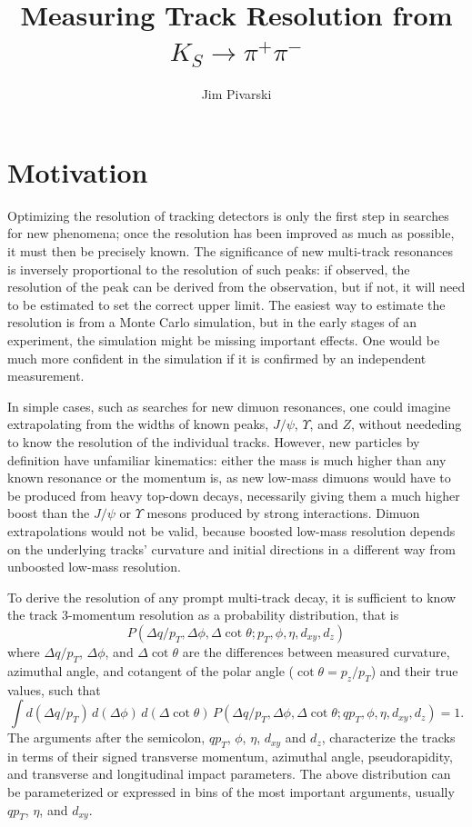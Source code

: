 \documentclass[12pt]{article}
\title{Measuring Track Resolution from $K_S \to \pi^+\pi^-$}
\author{Jim Pivarski}
\begin{document}
\maketitle

\section{Motivation}

Optimizing the resolution of tracking detectors is only the first step
in searches for new phenomena; once the resolution has been improved
as much as possible, it must then be precisely known.  The
significance of new multi-track resonances is inversely proportional
to the resolution of such peaks: if observed, the resolution of the
peak can be derived from the observation, but if not, it will need to
be estimated to set the correct upper limit.  The easiest way to
estimate the resolution is from a Monte Carlo simulation, but in the
early stages of an experiment, the simulation might be missing
important effects.  One would be much more confident in the simulation
if it is confirmed by an independent measurement.

In simple cases, such as searches for new dimuon resonances, one could
imagine extrapolating from the widths of known peaks, $J/\psi$,
$\Upsilon$, and $Z$, without neededing to know the resolution of the
individual tracks.  However, new particles by definition have
unfamiliar kinematics: either the mass is much higher than any known
resonance or the momentum is, as new low-mass dimuons would have to be
produced from heavy top-down decays, necessarily giving them a much
higher boost than the $J/\psi$ or $\Upsilon$ mesons produced by strong
interactions.  Dimuon extrapolations would not be valid, because
boosted low-mass resolution depends on the underlying tracks'
curvature and initial directions in a different way from unboosted
low-mass resolution.

To derive the resolution of any prompt multi-track decay, it is
sufficient to know the track 3-momentum resolution as a probability
distribution, that is
\begin{equation}
P(\Delta q/p_T, \Delta \phi, \Delta \cot\theta; p_T, \phi, \eta, d_{xy}, d_z)
\label{eqn:resolution}
\end{equation}
where $\Delta q/p_T$, $\Delta \phi$, and $\Delta \cot\theta$ are the
differences between measured curvature, azimuthal angle, and cotangent
of the polar angle ($\cot\theta = p_z/p_T$) and their true values,
such that
\begin{equation}
\int d(\Delta q/p_T) \, d(\Delta \phi) \, d(\Delta \cot\theta) \,
P(\Delta q/p_T, \Delta \phi, \Delta \cot\theta; q p_T, \phi, \eta, d_{xy}, d_z) =
1\mbox{.}
\end{equation}
The arguments after the semicolon, $q p_T$, $\phi$, $\eta$, $d_{xy}$
and $d_z$, characterize the tracks in terms of their signed transverse
momentum, azimuthal angle, pseudorapidity, and transverse and
longitudinal impact parameters.  The above distribution can be
parameterized or expressed in bins of the most important arguments,
usually $q p_T$, $\eta$, and $d_{xy}$.
\end{document}
